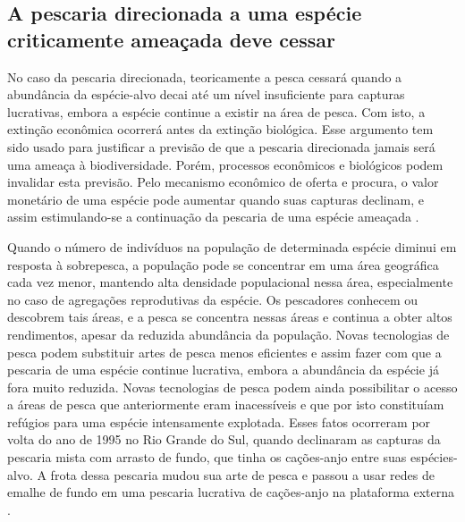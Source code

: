 \documentclass[a4paper,11pt,twoside,showtrims,onecolumn,openright,final]{memoir}
\begin{document}
\subsection*{A pescaria direcionada a  uma espécie criticamente ameaçada deve cessar}

No caso da pescaria direcionada, teoricamente a pesca cessará quando a abundância 
da espécie-alvo decai até um nível insuficiente para capturas lucrativas, embora a espécie 
continue a existir na área de pesca. Com isto, a extinção econômica ocorrerá antes da extinção 
biológica. Esse argumento tem sido usado para justificar a previsão de que a pescaria direcionada 
jamais será uma ameaça à biodiversidade. Porém, processos econômicos e biológicos podem invalidar 
esta previsão. Pelo mecanismo econômico de oferta e procura, o valor monetário de uma espécie pode 
aumentar quando suas capturas declinam, e assim estimulando-se a continuação da 
pescaria de uma espécie ameaçada \citep{dulvy2003}. %

Quando o número de indivíduos na população de determinada espécie diminui em resposta à sobrepesca, 
a população pode se concentrar em uma área geográfica cada vez menor, mantendo alta densidade populacional 
nessa área, especialmente no caso de agregações reprodutivas da espécie. Os pescadores conhecem ou 
descobrem tais áreas, e a pesca se concentra nessas áreas e continua a obter altos rendimentos, 
apesar da reduzida  abundância  da população. Novas tecnologias de pesca podem substituir artes 
de pesca menos eficientes e assim fazer com que a pescaria de uma espécie continue lucrativa, 
embora a abundância da espécie já fora muito reduzida. Novas tecnologias de pesca  podem ainda 
possibilitar o acesso a áreas de pesca que anteriormente eram inacessíveis e que por isto constituíam 
refúgios para uma espécie intensamente explotada. Esses fatos ocorreram por volta do ano de 1995 
no Rio Grande do Sul, quando declinaram as capturas da pescaria mista com arrasto de fundo, que tinha 
os cações-anjo entre suas espécies-alvo. A frota dessa pescaria mudou sua arte de pesca e passou a usar 
redes de emalhe de fundo em uma pescaria lucrativa de cações-anjo na plataforma externa \citep[Capítulo~\ref{chap:pesca-industrial}]{ibama1995}. %
\end{document}
